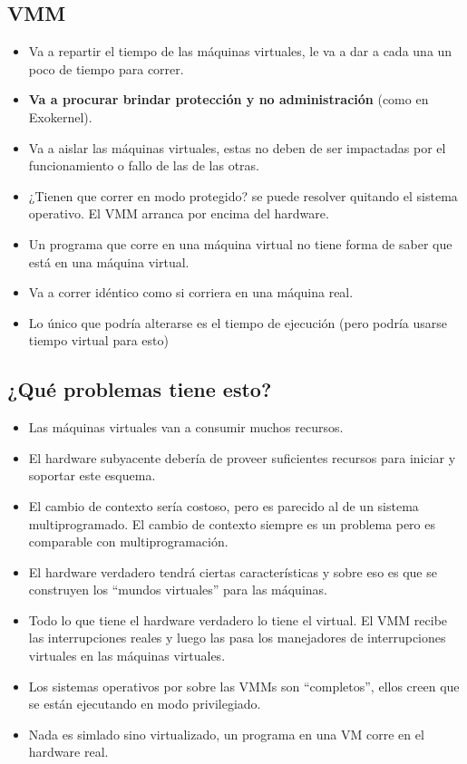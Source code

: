 \documentclass[12pt, times]{simauth}
\begin{document}
\subsection{VMM}
\begin{itemize}
    \item Va a repartir el tiempo de las máquinas virtuales, le va a dar a cada una un poco de tiempo para correr.
    \item \textbf{Va a procurar brindar protección y no administración} (como en Exokernel). 
    \item Va a aislar las máquinas virtuales, estas no deben de ser impactadas por el funcionamiento o fallo de las de las otras.
    \item ¿Tienen que correr en modo protegido? se puede resolver quitando el sistema operativo. El VMM arranca por encima del hardware.
    \item Un programa que corre en una máquina virtual no tiene forma de saber que está en una máquina virtual.
    \item Va a correr idéntico como si corriera en una máquina real.
    \item Lo único que podría alterarse es el tiempo de ejecución (pero podría usarse tiempo virtual para esto)
\end{itemize}

\subsection{¿Qué problemas tiene esto?}
\begin{itemize}
    \item Las máquinas virtuales van a consumir muchos recursos.
    \item El hardware subyacente debería de proveer suficientes recursos para iniciar y soportar este esquema.
    \item El cambio de contexto sería costoso, pero es parecido al de un sistema multiprogramado. El cambio de contexto siempre es un problema pero es comparable con multiprogramación.
    \item El hardware verdadero tendrá ciertas características y sobre eso es que se construyen los ``mundos virtuales'' para las máquinas.
   \item Todo lo que tiene el hardware verdadero lo tiene el virtual. El VMM recibe las interrupciones reales y luego las pasa los manejadores de interrupciones virtuales en las máquinas virtuales.
   \item Los sistemas operativos por sobre las VMMs son ``completos'', ellos creen que se están ejecutando en modo privilegiado.
   \item Nada es simlado sino virtualizado, un programa en una VM corre en el hardware real.
\end{itemize}
\end{document}
